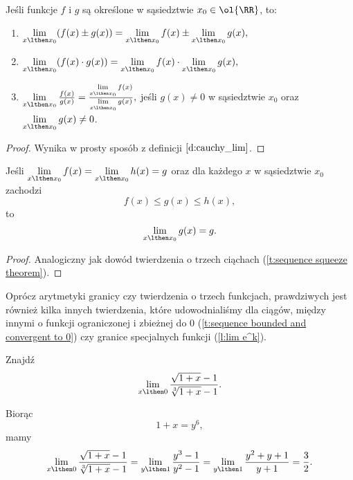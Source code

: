 \documentclass[11pt]{scrartcl}
\begin{document}
    \begin{theorem}
        Jeśli funkcje $f$ i $g$ są określone w sąsiedztwie $x_0 \in \ol{\RR}$, to:
        \begin{enumerate}
            \item $\lim\limits_{x\lthen x_0} (f(x) \pm g(x)) = \lim\limits_{x\lthen x_0} f(x) \pm \lim\limits_{x\lthen x_0} g(x),$
            \item $\lim\limits_{x\lthen x_0} (f(x) \cdot g(x)) = \lim\limits_{x\lthen x_0} f(x) \cdot \lim\limits_{x\lthen x_0} g(x),$
            \item $\lim\limits_{x\lthen x_0} \frac{f(x)}{g(x)} = \frac{\lim\limits_{x\lthen x_0} f(x)}{\lim\limits_{x\lthen x_0} g(x)},$ jeśli $g(x) \neq 0$ w sąsiedztwie $x_0$ oraz $\lim\limits_{x\lthen x_0} g(x) \neq 0$.
        \end{enumerate}
    \end{theorem}
    \begin{proof}
        Wynika w prosty sposób z definicji $\ref{d:cauchy_lim}$.
    \end{proof}

    \begin{theorem}
        \label{t:squeeze theorem}
        Jeśli $\lim\limits_{x\lthen x_0} f(x) = \lim\limits_{x\lthen x_0} h(x) = g$ oraz dla każdego $x$ w sąsiedztwie $x_0$ zachodzi
        \[ f(x) \leq g(x) \leq h(x), \]
        to
        \[ \lim\limits_{x\lthen x_0} g(x) = g. \]
    \end{theorem}
    \begin{proof}
        Analogiczny jak dowód twierdzenia o trzech ciąchach (\ref{t:sequence squeeze theorem}).
    \end{proof}

    \begin{remark}
        Oprócz arytmetyki granicy czy twierdzenia o trzech funkcjach, prawdziwych jest również kilka innych twierdzenia, które udowodnialiśmy dla ciągów, między innymi o funkcji ograniczonej i zbieżnej do $0$ (\ref{t:sequence bounded and convergent to 0}) czy granice specjalnych funkcji (\ref{l:lim e^k}).
    \end{remark}

    \begin{example}  %
        Znajdź
        \[ \lim_{x \lthen 0} \frac{\sqrt{1+ x} - 1}{\sqrt[3]{1 + x} - 1}. \]
    \end{example}
    \begin{solution}
        Biorąc
        \[ 1 + x = y^6, \]
        mamy
        \[ \lim_{x \lthen 0} \frac{\sqrt{1+ x} - 1}{\sqrt[3]{1 + x} - 1} = \lim_{y \lthen 1} \frac{y^3 - 1}{y^2 - 1} = \lim_{y \lthen 1} \frac{y^2 + y + 1}{y + 1} = \frac{3}{2}. \]
    \end{solution}
\end{document}
